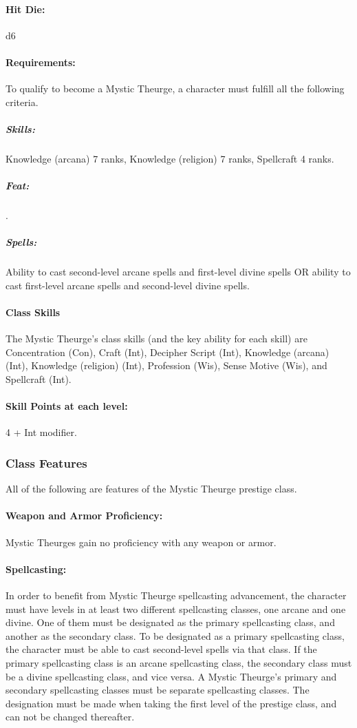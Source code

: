 \paragraph{Hit Die:} d6
\paragraph{Requirements:}
To qualify to become a Mystic Theurge, a character must fulfill all the following criteria.
\subparagraph{Skills:} Knowledge (arcana) 7 ranks, Knowledge (religion) 7 ranks, Spellcraft 4 ranks.
\subparagraph{Feat:} .
\subparagraph{Spells:} Ability to cast second-level arcane spells and first-level divine spells OR ability to cast first-level arcane spells and second-level divine spells.
\paragraph{Class Skills}
The Mystic Theurge's class skills (and the key ability for each skill) are Concentration (Con), Craft (Int), Decipher Script (Int), Knowledge (arcana) (Int), Knowledge (religion) (Int), Profession (Wis), Sense Motive (Wis), and Spellcraft (Int).
\paragraph{Skill Points at each level:} 4 + Int modifier.

\subsubsection{Class Features}
All of the following are features of the Mystic Theurge prestige class.

\paragraph{Weapon and Armor Proficiency:} Mystic Theurges gain no proficiency with any weapon or armor.

\paragraph{Spellcasting:} In order to benefit from Mystic Theurge spellcasting advancement, the character must have levels in at least two different spellcasting classes, one arcane and one divine. One of them must be designated as the primary spellcasting class, and another as the secondary class. To be designated as a primary spellcasting class, the character must be able to cast second-level spells via that class. If the primary spellcasting class is an arcane spellcasting class, the secondary class must be a divine spellcasting class, and vice versa. A Mystic Theurge's primary and secondary spellcasting classes must be separate spellcasting classes. The designation must be made when taking the first level of the prestige class, and can not be changed thereafter.

